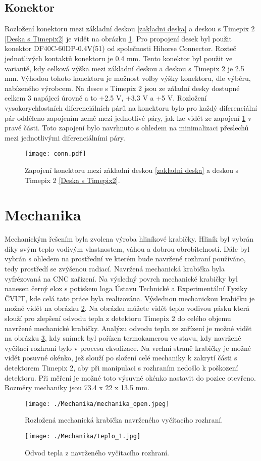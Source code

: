 	\subsection{Konektor}	%
	\label{konektor}
	Rozložení konektoru mezi základní deskou \ref{zakladni deska} a deskou s Timepix 2 \ref{Deska s Timepix2} je vidět na obrázku \ref{fig:konektor}. Pro propojení desek byl použit konektor DF40C-60DP-0.4V(51) od společnosti Hihorse Connector. Rozteč jednotlivých kontaktů konektoru je 0.4 mm. Tento konektor byl použit ve variantě, kdy celková výška mezi základní deskou a deskou s Timepix 2 je 2.5 mm. Výhodou tohoto konektoru je možnost volby výšky konektoru, dle výběru, nabízeného výrobcem. Na desce s Timepix 2 jsou ze záladní desky dostupné celkem 3 napájecí úrovně a to +2.5 V, +3.3 V a +5 V. Rozložení vysokorychlostních diferenciálních párů na konektoru bylo pro každý diferenciální pár odděleno zapojením země mezi jednotlivé páry, jak lze vidět ze zapojení \ref{fig:konektor} v pravé části. Toto zapojení bylo navrhnuto s ohledem na minimalizaci přeslechů mezi jednotlivými diferenciálními páry.
	\begin{figure}[h!]
		\centering
		\captionsetup{justification=centering}
		\texttt{[image: conn.pdf]}
		\caption{Zapojení konektoru mezi základní deskou \ref{zakladni deska} a deskou s Timepix 2 \ref{Deska s Timepix2}.} 
		\label{fig:konektor}
	\end{figure} 
	
\section{Mechanika}
	Mechanickým řešením byla zvolena výroba hliníkové krabičky. Hliník byl vybrán díky svým teplo vodivým vlastnostem, váhou a dobrou obrobitelností. Dále byl vybrán s ohledem na prostřední ve kterém bude navržené rozhraní používáno, tedy prostředí se zvýšenou radiací. Navržená mechanická krabička byla vyfrézovaná na CNC zařízení. Na výsledný povrch mechanické krabičky byl nanesen černý elox s potiskem loga Ústavu Technické a Experimentální Fyziky ČVUT, kde celá tato práce byla realizována. Výslednou mechanickou krabičku je možné vidět na obrázku \ref{fig:mechanika}. Na obrázku můžete vidět teplo vodivou pásku která slouží pro zlepšení odvodu tepla z detektoru Timepix 2 do celého objemu navržené mechanické krabičky. Analýzu odvodu tepla ze zařízení je možné vidět na obrázku \ref{fig:teplo}, kdy snímek byl pořízen termokamerou ve stavu, kdy navržené vyčítací rozhraní bylo v procesu ekvalizace. Na vrchní straně krabičky je možné vidět posuvné okénko, jež slouží po složení celé mechaniky k zakrytí části s detektorem Timepix 2, aby při manipulaci s rozhraním nedošlo k poškození detektoru. Při měření je možné toto výsuvné okénko nastavit do pozice otevřeno. Rozměry mechaniky jsou 73.4 x 22 x 13.5 mm. 
	\begin{figure}[h!]
		\centering
		\captionsetup{justification=centering}
		\texttt{[image: ./Mechanika/mechanika\_open.jpeg]}
		\caption{Rozložená mechanická krabička navrženého vyčítacího rozhraní.} 
		\label{fig:mechanika}
	\end{figure}
	
		\begin{figure}[h!]
		\centering
		\captionsetup{justification=centering}
		\texttt{[image: ./Mechanika/teplo\_1.jpg]}
		\caption{Odvod tepla z navrženého vyčítacího rozhraní.} 
		\label{fig:teplo}
	\end{figure}
	

	